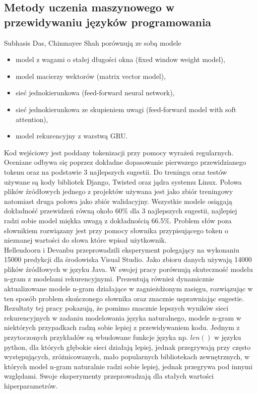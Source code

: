 \subsection{Metody uczenia maszynowego w przewidywaniu języków programowania}
Subhasis Das, Chinmayee Shah \cite{contextual_code_completion} porównują ze sobą modele
\begin{itemize}
    \item model z wagami o stałej długości okna (fixed window weight model), 
    \item model macierzy wektorów (matrix vector model),
    \item sieć jednokierunkowa (feed-forward neural network), 
    \item sieć jednokierunkowa ze skupieniem uwagi (feed-forward model with soft attention), 
    \item model rekurencyjny z warstwą GRU. 
\end{itemize}
Kod wejściowy jest poddany tokenizacji przy pomocy wyrażeń regularnych. Oceniane odbywa się poprzez dokładne
dopasowanie pierwszego przewidzianego tokenu oraz na podstawie 3 najlepszych sugestii. Do treningu oraz testów 
używane są kody bibliotek Django, Twisted oraz jądra systemu Linux. Połowa plików źródłowych jednego z 
projektów używana jest jako zbiór treningowy natomiast druga połowa jako zbiór walidacyjny. Wszystkie modele
osiągają dokładność przewidzeń równą około 60\% dla 3 najlepszych sugestii, najlepiej radzi sobie model miękka uwagą
z dokładnością 66.5\%. Problem słów poza słownikiem rozwiązany jest przy pomocy słownika przypisującego 
token o nieznanej wartości do słowa które wpisał użytkownik. \\

Hellendoorn i Devanbu przeprowadzili eksperyment polegający na wykonaniu 15000 predykcji dla 
środowiska Visual Studio. Jako zbioru danych używają 14000 plików źródłowych w języku Java. 
W swojej pracy porównują skuteczność modelu n-gram z modelami rekurencyjnymi. 
Prezentują również dynamicznie aktualizowane modele n-gram działające w zagnieżdżonym zasięgu, rozwiązując 
w ten sposób problem skończonego słownika oraz znacznie usprawniając sugestie. Rezultaty tej pracy 
pokazują, że pomimo znacznie lepszych wyników sieci rekurencyjnych w zadaniu modelowania języka 
naturalnego, modele n-gram w niektórych przypadkach radzą sobie lepiej z przewidywaniem kodu. Jednym
z przytoczonych przykładów są wbudowane funkcje języka np. \begin{math}len()\end{math} w języku python, dla których głębokie sieci działają lepiej, 
jednak przegrywają przy często występujących, zróżnicowanych,  mało popularnych bibliotekach zewnętrznych, 
w których model n-gram naturalnie radzi sobie lepiej, jednak przegrywa pod innymi względami. Swoje 
eksperymenty przeprowadzają dla stałych wartości hiperparametrów.\\

